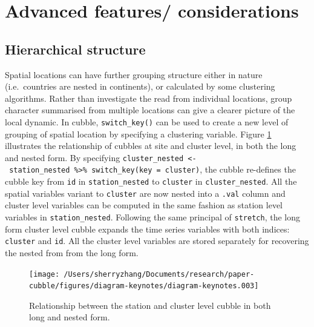 \documentclass[
]{jss}
\begin{document}
\hypertarget{advanced-features-considerations}{%
\section{Advanced features/
considerations}\label{advanced-features-considerations}}

\hypertarget{hierarchical-structure}{%
\subsection{Hierarchical structure}\label{hierarchical-structure}}

Spatial locations can have further grouping structure either in nature
(i.e.~countries are nested in continents), or calculated by some
clustering algorithms. Rather than investigate the read from individual
locations, group character summarised from multiple locations can give a
clearer picture of the local dynamic. In cubble, \texttt{switch\_key()}
can be used to create a new level of grouping of spatial location by
specifying a clustering variable. Figure \ref{fig:illu-hier} illustrates
the relationship of cubbles at site and cluster level, in both the long
and nested form. By specifying
\texttt{cluster\_nested\ \textless{}-\ station\_nested\ \%\textgreater{}\%\ switch\_key(key\ =\ cluster)},
the cubble re-defines the cubble key from \texttt{id} in
\texttt{station\_nested} to \texttt{cluster} in
\texttt{cluster\_nested}. All the spatial variables variant to
\texttt{cluster} are now nested into a \texttt{.val} column and cluster
level variables can be computed in the same fashion as station level
variables in \texttt{station\_nested}. Following the same principal of
\texttt{stretch}, the long form cluster level cubble expands the time
series variables with both indices: \texttt{cluster} and \texttt{id}.
All the cluster level variables are stored separately for recovering the
nested from from the long form.

\begin{CodeChunk}
\begin{figure}

{\centering \texttt{[image: /Users/sherryzhang/Documents/research/paper-cubble/figures/diagram-keynotes/diagram-keynotes.003]} 

}

\caption[Relationship between the station and cluster level cubble in both long and nested form]{Relationship between the station and cluster level cubble in both long and nested form.}\label{fig:illu-hier}
\end{figure}
\end{CodeChunk}
\end{document}

